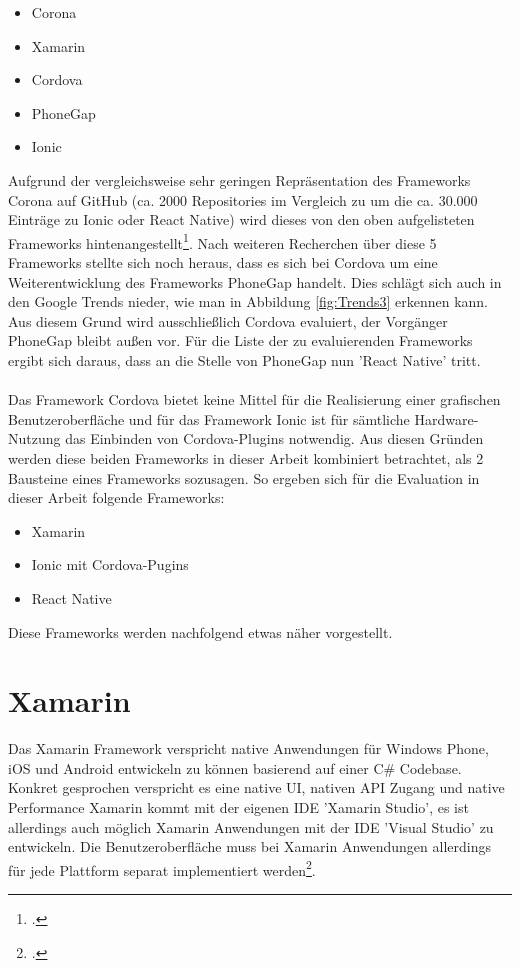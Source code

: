 \begin{itemize}
\item Corona
\item Xamarin
\item Cordova
\item PhoneGap
\item Ionic
\end{itemize}
Aufgrund der vergleichsweise sehr geringen Repräsentation des Frameworks Corona auf GitHub (ca. 2000 Repositories im Vergleich zu um die ca. 30.000 Einträge zu Ionic oder React Native) wird dieses von den oben aufgelisteten Frameworks hintenangestellt\footcite{GitHubTrending}. Nach weiteren Recherchen über diese 5 Frameworks stellte sich noch heraus, dass es sich bei Cordova um eine Weiterentwicklung des Frameworks PhoneGap handelt. Dies schlägt sich auch in den Google Trends nieder, wie man in Abbildung \ref{fig:Trends3} erkennen kann. Aus diesem Grund wird ausschließlich Cordova evaluiert, der Vorgänger PhoneGap bleibt außen vor. Für die Liste der zu evaluierenden Frameworks ergibt sich daraus, dass an die Stelle von PhoneGap nun 'React Native' tritt. 
\\
\\
Das Framework Cordova bietet keine Mittel für die Realisierung einer grafischen Benutzeroberfläche und für das Framework Ionic ist für sämtliche Hardware-Nutzung das Einbinden von Cordova-Plugins notwendig. Aus diesen Gründen werden diese beiden Frameworks in dieser Arbeit kombiniert betrachtet, als 2 Bausteine eines Frameworks sozusagen. So ergeben sich für die Evaluation in dieser Arbeit folgende Frameworks:
\begin{itemize}
\item Xamarin
\item Ionic mit Cordova-Pugins
\item React Native
\end{itemize}
Diese Frameworks werden nachfolgend etwas näher vorgestellt. 

\section{Xamarin} \label{chpXamarin}

Das Xamarin Framework verspricht native Anwendungen für Windows Phone, iOS und Android entwickeln zu können basierend auf einer C\# Codebase. Konkret gesprochen verspricht es eine native UI, nativen API Zugang und native Performance Xamarin kommt mit der eigenen IDE 'Xamarin Studio', es ist allerdings auch möglich Xamarin Anwendungen mit der IDE 'Visual Studio' zu entwickeln. Die Benutzeroberfläche muss bei Xamarin Anwendungen allerdings für jede Plattform separat implementiert werden\footcite{EinerFuerAlles}. 

